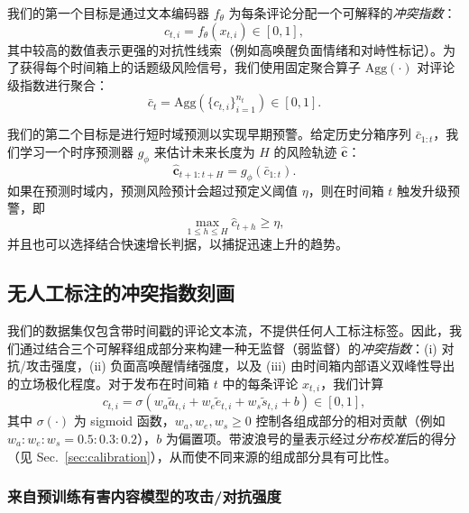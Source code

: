 \documentclass[conference]{IEEEtran}
\begin{document}
我们的第一个目标是通过文本编码器 $f_\theta$ 为每条评论分配一个可解释的\emph{冲突指数}：
\begin{equation}
c_{t,i} = f_\theta(x_{t,i}) \in [0, 1],
\end{equation}
其中较高的数值表示更强的对抗性线索（例如高唤醒负面情绪和对峙性标记）。为了获得每个时间箱上的话题级风险信号，我们使用固定聚合算子 $\mathrm{Agg}(\cdot)$ 对评论级指数进行聚合：
\begin{equation}
\bar{c}_t = \mathrm{Agg}\left(\{c_{t,i}\}_{i=1}^{n_t}\right) \in [0, 1].
\end{equation}

我们的第二个目标是进行短时域预测以实现早期预警。给定历史分箱序列 $\bar{c}_{1:t}$，我们学习一个时序预测器 $g_\phi$ 来估计未来长度为 $H$ 的风险轨迹 $\mathbf{\hat{c}}$：
\begin{equation}
\mathbf{\hat{c}}_{t+1:t+H} = g_\phi(\bar{c}_{1:t}).
\end{equation}
如果在预测时域内，预测风险预计会超过预定义阈值 $\eta$，则在时间箱 $t$ 触发升级预警，即
\begin{equation}
\max_{1 \le h \le H} \hat{c}_{t+h} \ge \eta,
\end{equation}
并且也可以选择结合快速增长判据，以捕捉迅速上升的趋势。

\subsection{无人工标注的冲突指数刻画}\label{sec:conflict_index}

我们的数据集仅包含带时间戳的评论文本流，不提供任何人工标注标签。因此，我们通过结合三个可解释组成部分来构建一种无监督（弱监督）的\emph{冲突指数}：(i) 对抗/攻击强度，(ii) 负面高唤醒情绪强度，以及 (iii) 由时间箱内部语义双峰性导出的立场极化程度。对于发布在时间箱 $t$ 中的每条评论 $x_{t,i}$，我们计算
\begin{equation}
c_{t,i} = \sigma\!\left(w_a \tilde{a}_{t,i} + w_e \tilde{e}_{t,i} + w_s \tilde{s}_{t,i} + b\right)\in[0,1],
\label{eq:conflict_index_fusion}
\end{equation}
其中 $\sigma(\cdot)$ 为 sigmoid 函数，$w_a,w_e,w_s \ge 0$ 控制各组成部分的相对贡献（例如 $w_a:w_e:w_s = 0.5:0.3:0.2$），$b$ 为偏置项。带波浪号的量表示经过\emph{分布校准}后的得分（见 Sec.~\ref{sec:calibration}），从而使不同来源的组成部分具有可比性。

\subsubsection{来自预训练有害内容模型的攻击/对抗强度}
\end{document}
